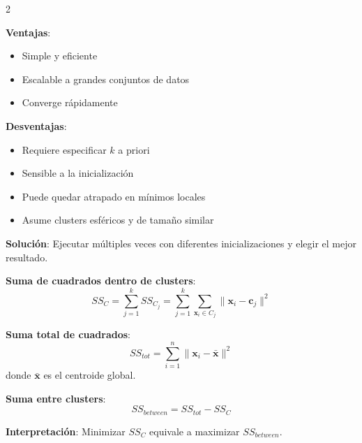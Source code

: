 \documentclass[10pt,a4paper]{article}
\begin{document}
\begin{multicols}{2}
    \begin{tcolorbox}[title=Propiedades del Algoritmo, equal height group=CL2]
        \textbf{Ventajas}:
        \begin{itemize}
            \item Simple y eficiente
            \item Escalable a grandes conjuntos de datos
            \item Converge rápidamente
        \end{itemize}
        
        \textbf{Desventajas}:
        \begin{itemize}
            \item Requiere especificar $k$ a priori
            \item Sensible a la inicialización
            \item Puede quedar atrapado en mínimos locales
            \item Asume clusters esféricos y de tamaño similar
        \end{itemize}
        
        \textbf{Solución}: Ejecutar múltiples veces con diferentes inicializaciones y elegir el mejor resultado.
    \end{tcolorbox}
    \begin{tcolorbox}[title=Suma de Cuadrados, equal height group=CL2]
        \textbf{Suma de cuadrados dentro de clusters}:
        \[
            SS_C = \sum_{j=1}^k SS_{C_j} = \sum_{j=1}^k \sum_{\mathbf{x}_i \in C_j} \|\mathbf{x}_i - \mathbf{c}_j\|^2
        \]
        
        \textbf{Suma total de cuadrados}:
        \[
            SS_{tot} = \sum_{i=1}^n \|\mathbf{x}_i - \bar{\mathbf{x}}\|^2
        \]
        donde $\bar{\mathbf{x}}$ es el centroide global.
        
        \textbf{Suma entre clusters}:
        \[
            SS_{between} = SS_{tot} - SS_C
        \]
        
        \textbf{Interpretación}: Minimizar $SS_C$ equivale a maximizar $SS_{between}$.
    \end{tcolorbox}
\end{multicols}

\end{document}
